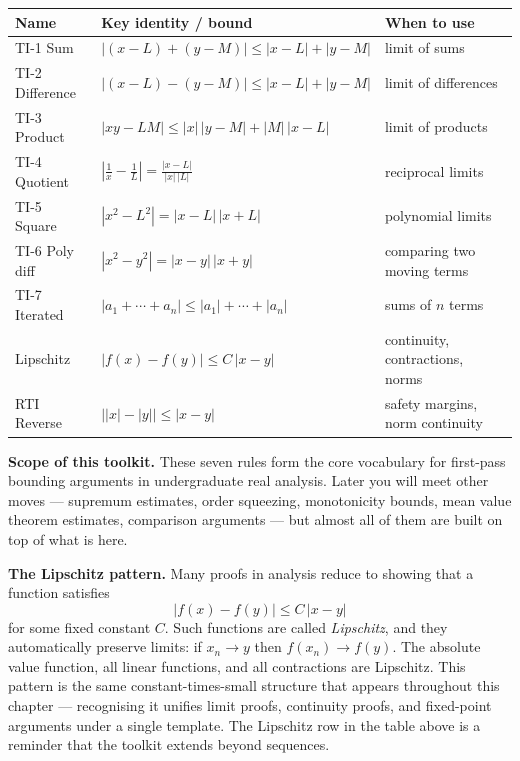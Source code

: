\begin{tcolorbox}[colback=gray!6, colframe=gray!40, arc=2pt,
  left=8pt, right=8pt, top=6pt, bottom=6pt,
  title={\small\textbf{Triangle Inequality Toolkit — Quick Reference}},
  fonttitle=\small\bfseries]
\small
\begin{tabular}{l l l}
\toprule
\textbf{Name} & \textbf{Key identity / bound} & \textbf{When to use} \\
\midrule
TI-1 Sum        & $|(x - L) + (y - M)| \le |x - L| + |y - M|$ & limit of sums \\
TI-2 Difference & $|(x - L) - (y - M)| \le |x - L| + |y - M|$ & limit of differences \\
TI-3 Product    & $|xy - LM| \le |x|\,|y - M| + |M|\,|x - L|$ & limit of products \\
TI-4 Quotient   & $\displaystyle\left|\tfrac{1}{x} - \tfrac{1}{L}\right|
                    = \tfrac{|x - L|}{|x|\,|L|}$      & reciprocal limits \\
TI-5 Square     & $|x^2 - L^2| = |x - L|\,|x + L|$  & polynomial limits \\
TI-6 Poly diff  & $|x^2 - y^2| = |x - y|\,|x + y|$  & comparing two moving terms \\
TI-7 Iterated   & $|a_1 + \cdots + a_n| \le |a_1| + \cdots + |a_n|$ & sums of $n$ terms \\
\midrule
Lipschitz       & $|f(x) - f(y)| \le C\,|x - y|$    & continuity, contractions, norms \\
\midrule
RTI Reverse     & $\bigl||x| - |y|\bigr| \le |x - y|$ & safety margins, norm continuity \\
\bottomrule
\end{tabular}
\end{tcolorbox}

\medskip

\noindent\textbf{Scope of this toolkit.}
These seven rules form the core vocabulary for first-pass bounding
arguments in undergraduate real analysis.
Later you will meet other moves — supremum estimates, order squeezing,
monotonicity bounds, mean value theorem estimates, comparison arguments
— but almost all of them are built on top of what is here.

\medskip

\noindent\textbf{The Lipschitz pattern.}
Many proofs in analysis reduce to showing that a function satisfies
\[
  |f(x) - f(y)| \le C\,|x - y|
\]
for some fixed constant $C$.
Such functions are called \emph{Lipschitz}, and they automatically
preserve limits: if $x_n \to y$ then $f(x_n) \to f(y)$.
The absolute value function, all linear functions, and all contractions
are Lipschitz.
This pattern is the same constant-times-small structure that appears
throughout this chapter — recognising it unifies limit proofs,
continuity proofs, and fixed-point arguments under a single template.
The Lipschitz row in the table above is a reminder that the toolkit
extends beyond sequences.

